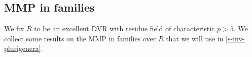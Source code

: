 \documentclass[a4paper,12pt]{book}
\DeclareMathOperator{\Spec}{Spec}
\begin{document}
%	
%	
	
	\subsection{MMP in families}
	
	We fix $R$ to be an excellent DVR with residue field of characteristic $p>5$.
	We collect some results on the MMP in families over $R$ that we will use in \autoref{s-inv-plurigenera}.
	
\end{document}
